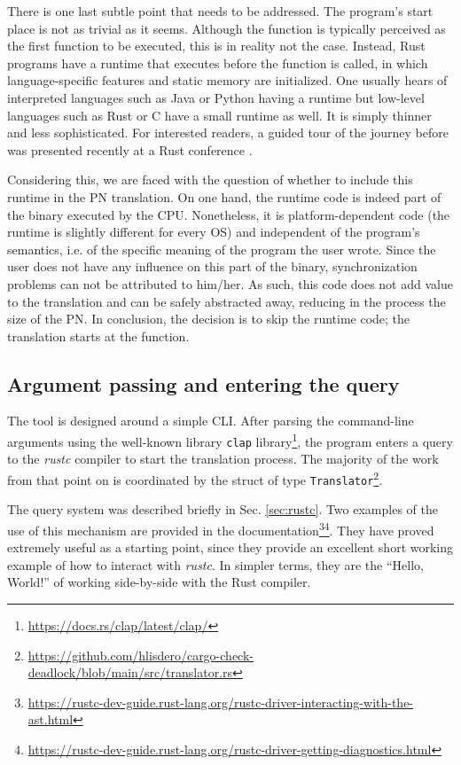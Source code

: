 There is one last subtle point that needs to be addressed.
The program's start place is not as trivial as it seems.
Although the  function is typically perceived
as the first function to be executed,
this is in reality not the case.
Instead, Rust programs have a runtime that executes
before the  function is called,
in which language-specific features and static memory are initialized.
One usually hears of interpreted languages such as Java or Python having a runtime
but low-level languages such as Rust or C have a small runtime as well.
It is simply thinner and less sophisticated.
For interested readers, a guided tour of the journey before 
was presented recently at a Rust conference \cite{levick2022}.

Considering this, we are faced with the question of
whether to include this runtime in the \acrshort{PN} translation.
On one hand, the runtime code is indeed part of the binary executed by the \acrshort{CPU}.
Nonetheless, it is platform-dependent code
(the runtime is slightly different for every \acrshort{OS})
and independent of the program's semantics,
i.e. of the specific meaning of the program the user wrote.
Since the user does not have any influence on this part of the binary,
synchronization problems can not be attributed to him/her.
As such, this code does not add value to the translation
and can be safely abstracted away,
reducing in the process the size of the \acrshort{PN}.
In conclusion, the decision is to skip the runtime code;
the translation starts at the  function.

\subsection{Argument passing and entering the query}

The tool is designed around a simple \acrfull{CLI}.
After parsing the command-line arguments using the well-known
library \texttt{clap} library\footnote{\url{https://docs.rs/clap/latest/clap/}},
the program enters a query to the \emph{rustc} compiler
to start the translation process.
The majority of the work from that point on is coordinated
by the struct of type \texttt{Translator}\footnote{\url{https://github.com/hlisdero/cargo-check-deadlock/blob/main/src/translator.rs}}.

The query system was described briefly in Sec. \ref{sec:rustc}.
Two examples of the use of this mechanism are provided in the
documentation\footnote{\url{https://rustc-dev-guide.rust-lang.org/rustc-driver-interacting-with-the-ast.html}}\footnote{\url{https://rustc-dev-guide.rust-lang.org/rustc-driver-getting-diagnostics.html}}.
They have proved extremely useful as a starting point,
since they provide an excellent short working example of
how to interact with \emph{rustc}.
In simpler terms, they are the ``Hello, World!''
of working side-by-side with the Rust compiler.

